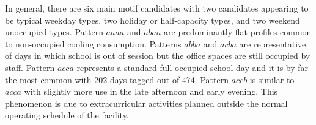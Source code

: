 In general, there are six main motif candidates with two candidates appearing to be typical weekday types, two holiday or half-capacity types, and two weekend unoccupied types. Pattern $aaaa$ and $abaa$ are predominantly flat profiles common to non-occupied cooling consumption. Patterns $abba$ and $acba$ are representative of days in which school is out of session but the office spaces are still occupied by staff. Pattern $acca$ represents a standard full-occupied school day and it is by far the most common with 202 days tagged out of 474. Pattern $accb$ is similar to $acca$ with slightly more use in the late afternoon and early evening. This phenomenon is due to extracurricular activities planned outside the normal operating schedule of the facility.
